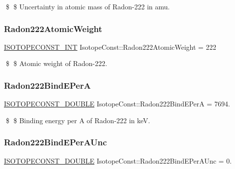 \$ \$ Uncertainty in atomic mass of Radon-\/222 in amu. \mbox{\label{group___isotope_const-_radon-_rn222_gac58a1d19a437dbc1a1dda822156508f5}} 
\subsubsection{\texorpdfstring{Radon222\+Atomic\+Weight}{Radon222AtomicWeight}}
{\footnotesize\ttfamily \mbox{\hyperlink{group___isotope_const-_macros_ga5f18360b3e99483a35c32d789e62621c}{I\+S\+O\+T\+O\+P\+E\+C\+O\+N\+S\+T\+\_\+\+I\+NT}} Isotope\+Const\+::\+Radon222\+Atomic\+Weight = 222}

\$ \$ Atomic weight of Radon-\/222. \mbox{\label{group___isotope_const-_radon-_rn222_gaead27f895f3d7a4cf4aa700457ea0494}} 
\subsubsection{\texorpdfstring{Radon222\+Bind\+E\+PerA}{Radon222BindEPerA}}
{\footnotesize\ttfamily \mbox{\hyperlink{group___isotope_const-_macros_ga8f45a7272ce02c0b4c65c44636ed719a}{I\+S\+O\+T\+O\+P\+E\+C\+O\+N\+S\+T\+\_\+\+D\+O\+U\+B\+LE}} Isotope\+Const\+::\+Radon222\+Bind\+E\+PerA = 7694.}

\$ \$ Binding energy per A of Radon-\/222 in keV. \mbox{\label{group___isotope_const-_radon-_rn222_ga9293b6c5adb6c7ac39087b6030cd2167}} 
\subsubsection{\texorpdfstring{Radon222\+Bind\+E\+Per\+A\+Unc}{Radon222BindEPerAUnc}}
{\footnotesize\ttfamily \mbox{\hyperlink{group___isotope_const-_macros_ga8f45a7272ce02c0b4c65c44636ed719a}{I\+S\+O\+T\+O\+P\+E\+C\+O\+N\+S\+T\+\_\+\+D\+O\+U\+B\+LE}} Isotope\+Const\+::\+Radon222\+Bind\+E\+Per\+A\+Unc = 0.}

